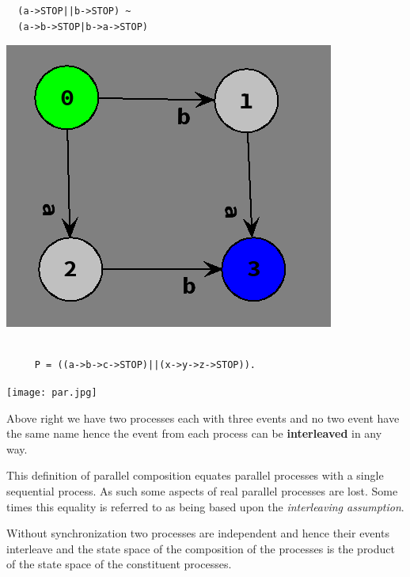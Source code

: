 \documentclass[]{article}
\begin{document}
 \begin{minipage}{0.37\textwidth}
 \begin{center}
 \begin{verbatim}
  (a->STOP||b->STOP) ~ 
  (a->b->STOP|b->a->STOP)
 \end{verbatim}
 \includegraphics[scale=0.5]{Interleave.png}
 \end{center}
 \end{minipage}
\begin{minipage}{0.6\textwidth}
\begin{minipage} {0.4\textwidth}
\begin{verbatim}

     P = ((a->b->c->STOP)||(x->y->z->STOP)).
\end{verbatim}
\end{minipage}

\texttt{[image: par.jpg]}
\end{minipage}


Above right we have two processes each with three events and no two event have the same name hence the event from each process can be {\bf interleaved} in any way.

This definition of parallel composition equates parallel processes with a single sequential process. As such some aspects  of real parallel processes are lost. Some times this  equality is referred to as being based upon the \emph{interleaving assumption}.



Without synchronization  two processes   are independent and hence their events interleave and the state space of the composition of the processes is the product of the state space of the constituent processes.
\end{document}
